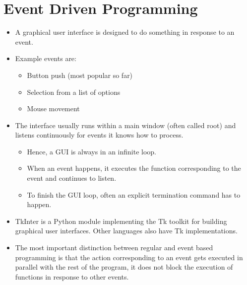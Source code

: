\documentclass[letterpaper,10pt,english]{sphinxmanual}
\begin{document}
\section{Event Driven Programming}
\label{\detokenize{lecture_notes/lec22_tkinter:event-driven-programming}}\begin{itemize}
\item {} 
A graphical user interface is designed to do something in response
to an event.

\item {} 
Example events are:
\begin{itemize}
\item {} 
Button push (most popular so far)

\item {} 
Selection from a list of options

\item {} 
Mouse movement

\end{itemize}

\item {} 
The interface usually runs within a main window (often called
root) and listens continuously for events it knows how to process.
\begin{itemize}
\item {} 
Hence, a GUI is always in an infinite loop.

\item {} 
When an event happens, it executes the function corresponding to
the event and continues to listen.

\item {} 
To finish the GUI loop, often an explicit termination command
has to happen.

\end{itemize}

\item {} 
TkInter is a Python module implementing the Tk toolkit for building
graphical user interfaces. Other languages also have Tk
implementations.

\item {} 
 The most important distinction between regular and event
based programming is that the action corresponding to an event gets
executed in parallel with the rest of the program, it does not
block the execution of functions in response to other events.

\end{itemize}
\end{document}

